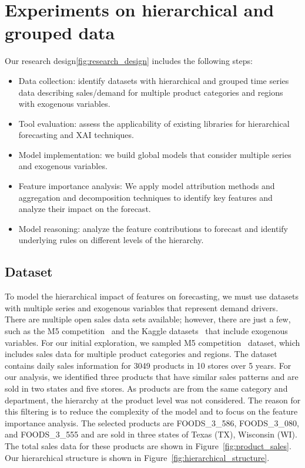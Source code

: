 
\section{Experiments on hierarchical and grouped data}
\label{sec:experiments_on_hierarchical_and_grouped_data}

Our research design\ref{fig:research_design} includes the following steps:
\begin{itemize}
    \item Data collection: identify datasets with hierarchical and grouped time series data describing sales/demand for multiple product categories and regions with exogenous variables.
    \item Tool evaluation: assess the applicability of existing libraries for hierarchical forecasting and XAI techniques.
    \item Model implementation: we build global models that consider multiple series and exogenous variables.
    \item Feature importance analysis: We apply model attribution methods and aggregation and decomposition techniques to identify key features and analyze their impact on the forecast.
    \item Model reasoning: analyze the feature contributions to forecast and identify underlying rules on different levels of the hierarchy.
\end{itemize}




\subsection{Dataset}
To model the hierarchical impact of features on forecasting, we must use datasets with multiple series and exogenous variables that represent demand drivers.
There are multiple open sales data sets available; however, there are just a few, such as the M5 competition~\citep{makridakis_m5_2022} and the Kaggle datasets~\citep{favorita-sales} that include exogenous variables.
For our initial exploration, we sampled M5 competition~\citep{makridakis_m5_2022} dataset, which includes sales data for multiple product categories and regions.
The dataset contains daily sales information for 3049 products in 10 stores over 5 years.
For our analysis, we identified three products that have similar sales patterns and are sold in two states and five stores.
As products are from the same category and department, the hierarchy at the product level was not considered.
The reason for this filtering is to reduce the complexity of the model and to focus on the feature importance analysis.
The selected products are FOODS\_3\_586, FOODS\_3\_080, and FOODS\_3\_555 and are sold in three states of Texas (TX), Wisconsin (WI).
The total sales data for these products are shown in Figure~\ref{fig:product_sales}.
Our hierarchical structure is shown in Figure~\ref{fig:hierarchical_structure}.


